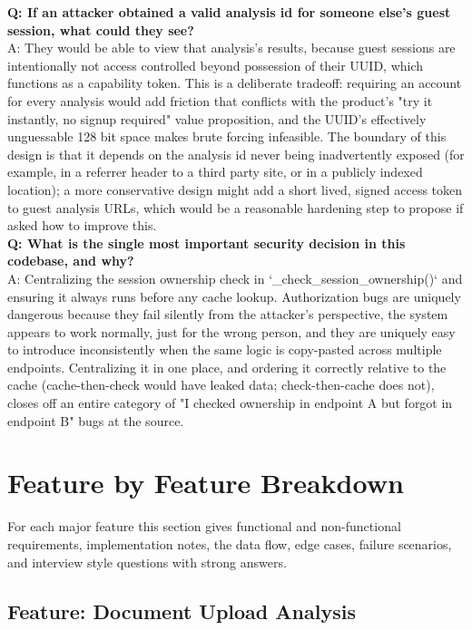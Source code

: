 \documentclass[11pt,a4paper]{report}
\begin{document}
\begin{qabox}
\textbf{Q: If an attacker obtained a valid analysis id for someone else's guest session, what could they see?} \\
A: They would be able to view that analysis's results, because guest sessions are intentionally not access controlled beyond possession of their UUID, which functions as a capability token. This is a deliberate tradeoff: requiring an account for every analysis would add friction that conflicts with the product's "try it instantly, no signup required" value proposition, and the UUID's effectively unguessable 128 bit space makes brute forcing infeasible. The boundary of this design is that it depends on the analysis id never being inadvertently exposed (for example, in a referrer header to a third party site, or in a publicly indexed location); a more conservative design might add a short lived, signed access token to guest analysis URLs, which would be a reasonable hardening step to propose if asked how to improve this. \\[4pt]
\textbf{Q: What is the single most important security decision in this codebase, and why?} \\
A: Centralizing the session ownership check in `_check_session_ownership()` and ensuring it always runs before any cache lookup. Authorization bugs are uniquely dangerous because they fail silently from the attacker's perspective, the system appears to work normally, just for the wrong person, and they are uniquely easy to introduce inconsistently when the same logic is copy-pasted across multiple endpoints. Centralizing it in one place, and ordering it correctly relative to the cache (cache-then-check would have leaked data; check-then-cache does not), closes off an entire category of "I checked ownership in endpoint A but forgot in endpoint B" bugs at the source.
\end{qabox}

\chapter{Feature by Feature Breakdown}

For each major feature this section gives functional and non-functional requirements, implementation notes, the data flow, edge cases, failure scenarios, and interview style questions with strong answers.

\section{Feature: Document Upload Analysis}
\end{document}

